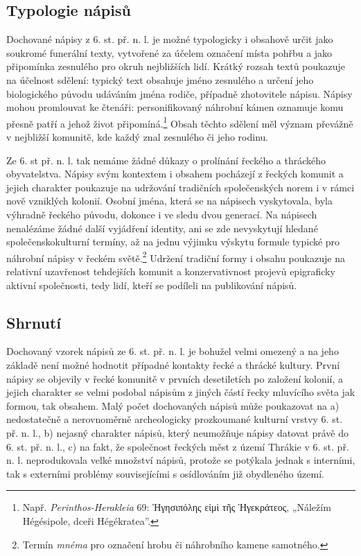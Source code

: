 \subsection[typologie-nápisů]{Typologie nápisů}

Dochované nápisy z 6. st. př. n. l. je možné typologicky i obsahově určit jako soukromé funerální texty, vytvořené za účelem označení místa pohřbu a jako připomínka zesnulého pro okruh nejbližších lidí. Krátký rozsah textů poukazuje na účelnost sdělení: typický text obsahuje jméno zesnulého a určení jeho biologického původu udáváním jména rodiče, případně zhotovitele nápisu. Nápisy mohou promlouvat ke čtenáři: personifikovaný náhrobní kámen oznamuje komu přesně patří a jehož život připomíná.\footnote{Např. {\em Perinthos-Herakleia} 69: Ἡγησιπόλης εἰμὶ τῆς Ἡγεκράτεος, „Náležím Hégésipole, dceři Hégékratea”.} Obsah těchto sdělení měl význam převážně v nejbližší komunitě, kde každý znal zesnulého či jeho rodinu.

Ze 6. st př. n. l. tak nemáme žádné důkazy o prolínání řeckého a thráckého obyvatelstva. Nápisy svým kontextem i obsahem pocházejí z řeckých komunit a jejich charakter poukazuje na udržování tradičních společenských norem i v rámci nově vzniklých kolonií. Osobní jména, která se na nápisech vyskytovala, byla výhradně řeckého původu, dokonce i ve sledu dvou generací. Na nápisech nenalézáme žádné další vyjádření identity, ani se zde nevyskytují hledané společenskokulturní termíny, až na jednu výjimku výskytu formule typické pro náhrobní nápisy v řeckém světě.\footnote{Termín {\em mnéma} pro označení hrobu či náhrobního kamene samotného.} Udržení tradiční formy i obsahu poukazuje na relativní uzavřenost tehdejších komunit a konzervativnost projevů epigraficky aktivní společnosti, tedy lidí, kteří se podíleli na publikování nápisů.

\subsection[shrnutí-3]{Shrnutí}

Dochovaný vzorek nápisů ze 6. st. př. n. l. je bohužel velmi omezený a na jeho základě není možné hodnotit případné kontakty řecké a thrácké kultury. První nápisy se objevily v řecké komunitě v prvních desetiletích po založení kolonií, a jejich charakter se velmi podobal nápisům z jiných částí řecky mluvícího světa jak formou, tak obsahem. Malý počet dochovaných nápisů může poukazovat na a) nedostatečně a nerovnoměrně archeologicky prozkoumané kulturní vrstvy 6. st. př. n. l., b) nejasný charakter nápisů, který neumožňuje nápisy datovat právě do 6. st. př. n. l., c) na fakt, že společnost řeckých měst z území Thrákie v 6. st. př. n. l. neprodukovala velké množství nápisů, protože se potýkala jednak s interními, tak s externími problémy souvisejícími s osídlováním již obydleného území.

